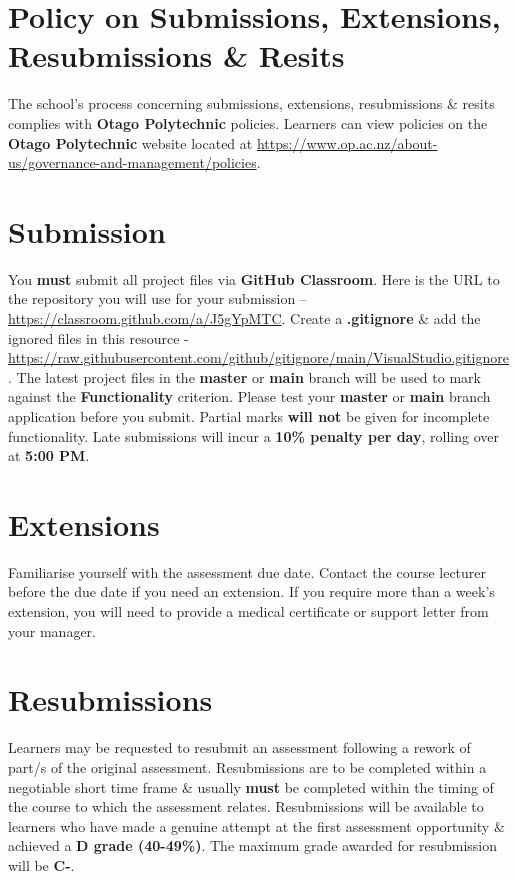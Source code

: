 \documentclass{article}
\begin{document}
\section*{Policy on Submissions, Extensions, Resubmissions \& Resits}
The school's process concerning submissions, extensions, resubmissions \& resits complies with \textbf{Otago Polytechnic} policies. Learners can view policies on the \textbf{Otago Polytechnic} website located at \href{https://www.op.ac.nz/about-us/governance-and-management/policies}{https://www.op.ac.nz/about-us/governance-and-management/policies}.

\section*{Submission}
You \textbf{must} submit all project files via \textbf{GitHub Classroom}. Here is the URL to the repository you will use for your submission – \href{https://classroom.github.com/a/J5gYpMTC}{https://classroom.github.com/a/J5gYpMTC}.  Create a \textbf{.gitignore} \& add the ignored files in this resource - \href{https://raw.githubusercontent.com/github/gitignore/main/VisualStudio.gitignore}{https://raw.githubusercontent.com/github/gitignore/main/VisualStudio.gitignore}. The latest project files in the \textbf{master} or \textbf{main} branch will be used to mark against the \textbf{Functionality} criterion. Please test your \textbf{master} or \textbf{main} branch application before you submit. Partial marks \textbf{will not} be given for incomplete functionality. Late submissions will incur a \textbf{10\% penalty per day}, rolling over at \textbf{5:00 PM}.

\section*{Extensions}
Familiarise yourself with the assessment due date. Contact the course lecturer before the due date if you need an extension. If you require more than a week's extension, you will need to provide a medical certificate or support letter from your manager.

\section*{Resubmissions}
Learners may be requested to resubmit an assessment following a rework of part/s of the original assessment. Resubmissions are to be completed within a negotiable short time frame \& usually \textbf{must} be completed within the timing of the course to which the assessment relates. Resubmissions will be available to learners who have made a genuine attempt at the first assessment opportunity \& achieved a \textbf{D grade (40-49\%)}. The maximum grade awarded for resubmission will be \textbf{C-}.
\end{document}
